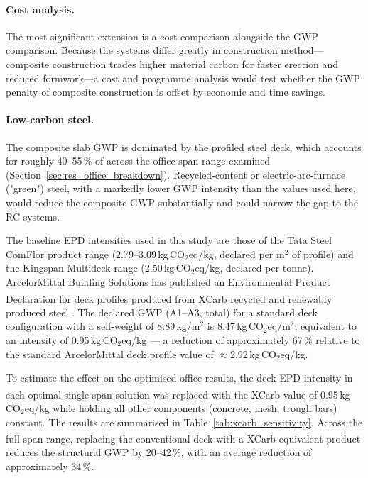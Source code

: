 \paragraph{Cost analysis.} The most significant extension is a cost comparison alongside the GWP comparison. Because the systems differ greatly in construction method---composite construction trades higher material carbon for faster erection and reduced formwork---a cost and programme analysis would test whether the GWP penalty of composite construction is offset by economic and time savings.

\paragraph{Low-carbon steel.}
The composite slab GWP is dominated by the profiled steel deck, which accounts for roughly 40--55\,\% of \gwpstruct{} across the office span range examined (Section~\ref{sec:res_office_breakdown}). Recycled-content or electric-arc-furnace ("green") steel, with a markedly lower GWP intensity than the values used here, would reduce the composite GWP substantially and could narrow the gap to the RC systems.

The baseline EPD intensities used in this study are those of the Tata Steel ComFlor product range (2.79--3.09\,kg\,CO$_2$eq/kg, declared per m$^2$ of profile) and the Kingspan Multideck range (2.50\,kg\,CO$_2$eq/kg, declared per tonne). ArcelorMittal Building Solutions has published an Environmental Product Declaration for deck profiles produced from XCarb\textsuperscript{\textregistered} recycled and renewably produced steel \citep{RefWorks:RefID:121-2025deck}. The declared GWP (A1--A3, total) for a standard deck configuration with a self-weight of 8.89\,kg/m$^2$ is 8.47\,kg\,CO$_2$eq/m$^2$, equivalent to an intensity of 0.95\,kg\,CO$_2$eq/kg --- a reduction of approximately 67\,\% relative to the standard ArcelorMittal deck profile \citep{RefWorks:RefID:115-peters2022epdamc20210146cbb2en} value of $\approx$2.92\,kg\,CO$_2$eq/kg.

To estimate the effect on the optimised office results, the deck EPD intensity in each optimal single-span solution was replaced with the XCarb\textsuperscript{\textregistered} value of 0.95\,kg\,CO$_2$eq/kg while holding all other components (concrete, mesh, trough bars) constant. The results are summarised in Table~\ref{tab:xcarb_sensitivity}. Across the full span range, replacing the conventional deck with a
XCarb\textsuperscript{\textregistered}-equivalent product reduces the structural GWP by 20--42\,\%, with an average reduction of approximately 34\,\%.

